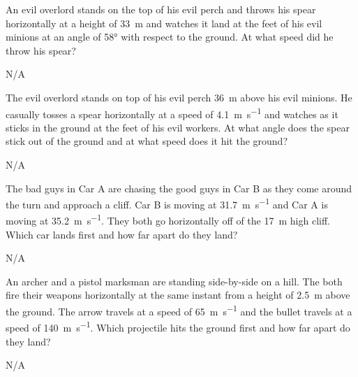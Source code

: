 \begin{question}[ID=horizontal-A-Q04,topic=projectiles,difficulty=A]
    An evil overlord stands on the top of his evil perch and
        throws his spear horizontally at a height of \SI{33}{\meter}
        and watches it land at the feet of his evil minions
        at an angle of \ang{58} with respect to the ground.
    At what speed did he throw his spear?
\end{question}
\begin{solution}
    N/A
\end{solution}


\begin{question}[ID=horizontal-A-Q05,topic=projectiles,difficulty=A]
    The evil overlord stands on top of his evil perch
        \SI{36}{\meter} above his evil minions.
    He casually tosses a spear horizontally at a speed
        of \SI{4.1}{\meter\per\second} and watches as it
        sticks in the ground at the feet of his evil workers.
    At what angle does the spear stick out of the ground and
        at what speed does it hit the ground?
\end{question}
\begin{solution}
    N/A
\end{solution}


\begin{question}[ID=horizontal-B-Q01,topic=projectiles,difficulty=easy]
    The bad guys in Car A are chasing the good guys in Car B
        as they come around the turn and approach a cliff.
    Car B is moving at \SI{31.7}{\meter\per\second} and 
        Car A is moving at \SI{35.2}{\meter\per\second}.
    They both go horizontally off of the \SI{17}{\meter}
        high cliff.
    Which car lands first and how far apart do they land?
\end{question}
\begin{solution}
    N/A
\end{solution}


\begin{question}[ID=horizontal-B-Q02,topic=projectiles,difficulty=B]
    An archer and a pistol marksman are standing side-by-side
        on a hill.
    The both fire their weapons horizontally at the same instant
        from a height of \SI{2.5}{\meter} above the ground.
    The arrow travels at a speed of \SI{65}{\meter\per\second}
        and the bullet travels at a speed of \SI{140}{\meter\per\second}.
    Which projectile hits the ground first and how far apart do they land?
\end{question}
\begin{solution}
    N/A
\end{solution}


